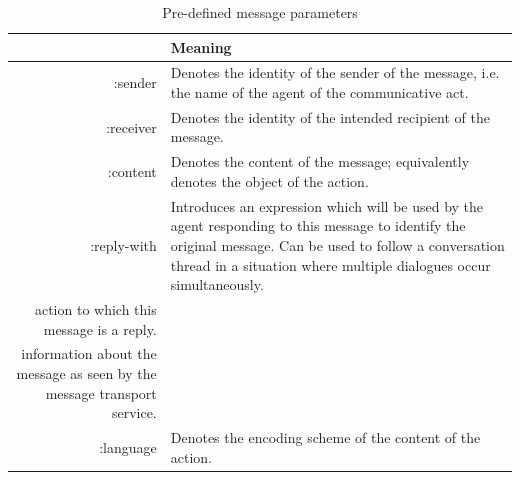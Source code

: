 \documentclass[main.tex]{subfiles}
\begin{document}
\begin{table}[htbp]
    \footnotesize
    \renewcommand{\arraystretch}{1.8}
    \caption{Pre-defined message parameters \cite{IntelligentPhysicalAgents2001}}
    \centering\begin{tabularx}{.8\textwidth}{>{\ttfamily}rX}
        \toprule
        \multicolumn{1}{p{8em}}{\bf \centering Message \newline Parameter} & \bf \centering Meaning \arraybackslash                \\\midrule
        :sender                                                            & Denotes the identity of the sender of the message,
        i.e. the name of the agent of the communicative act.                                                                       \\\midrule
        :receiver                                                          & Denotes the identity of the intended recipient of the
        message.                                                                                                                   \\\midrule
        :content                                                           & Denotes the content of the message; equivalently
        denotes the object of the action.                                                                                          \\\midrule
        :reply-with                                                        & Introduces an expression which will be used by the
        agent responding to this message to identify the
        original message. Can be used to follow a
        conversation thread in a situation where multiple
        dialogues occur simultaneously.                                                                                            \\\midrule
        action to which this message is a reply.                                                                                   \\\midrule
        information about the message as seen by the
        message transport service.                                                                                                 \\\midrule
        :language                                                          & Denotes the encoding scheme of the content of the
        action.                                                                                                                    \\\midrule

\end{tabularx}
\end{table}
\end{document}

